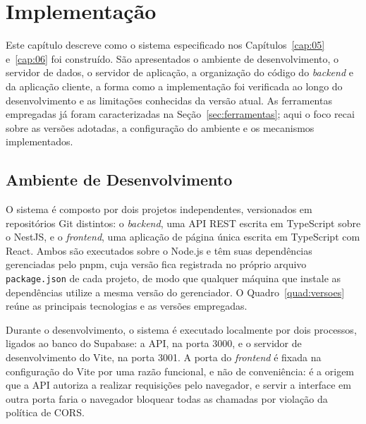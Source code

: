 \chapter{Implementação}
\label{cap:07}

Este capítulo descreve como o sistema especificado nos Capítulos~\ref{cap:05} e~\ref{cap:06} foi construído. São apresentados o ambiente de desenvolvimento, o servidor de dados, o servidor de aplicação, a organização do código do \textit{backend} e da aplicação cliente, a forma como a implementação foi verificada ao longo do desenvolvimento e as limitações conhecidas da versão atual. As ferramentas empregadas já foram caracterizadas na Seção~\ref{sec:ferramentas}; aqui o foco recai sobre as versões adotadas, a configuração do ambiente e os mecanismos implementados.

\section{Ambiente de Desenvolvimento}

O sistema é composto por dois projetos independentes, versionados em repositórios Git distintos: o \textit{backend}, uma API REST escrita em TypeScript sobre o NestJS, e o \textit{frontend}, uma aplicação de página única escrita em TypeScript com React. Ambos são executados sobre o Node.js e têm suas dependências gerenciadas pelo pnpm, cuja versão fica registrada no próprio arquivo \texttt{package.json} de cada projeto, de modo que qualquer máquina que instale as dependências utilize a mesma versão do gerenciador. O Quadro~\ref{quad:versoes} reúne as principais tecnologias e as versões empregadas.

Durante o desenvolvimento, o sistema é executado localmente por dois processos, ligados ao banco do Supabase: a API, na porta 3000, e o servidor de desenvolvimento do Vite, na porta 3001. A porta do \textit{frontend} é fixada na configuração do Vite por uma razão funcional, e não de conveniência: é a origem que a API autoriza a realizar requisições pelo navegador, e servir a interface em outra porta faria o navegador bloquear todas as chamadas por violação da política de CORS.

